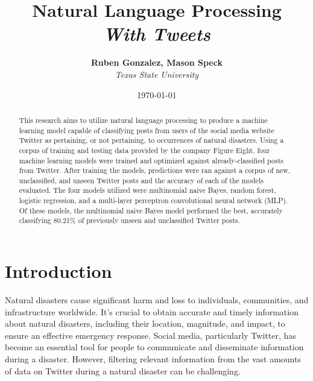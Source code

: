 \documentclass[11pt]{diazessay} %
\title{\textbf{Natural Language Processing} \\ {\Large\itshape With Tweets}} %
\author{\textbf{Ruben Gonzalez, Mason Speck} \\ \textit{Texas State University}} %
\date{\today} %
\begin{document}
\maketitle %



\begin{abstract}
This research aims to utilize natural language processing to produce a machine learning model capable of classifying posts from users of the social media website Twitter as pertaining, or not pertaining, to occurrences of natural disasters. Using a corpus of training and testing data provided by the company Figure Eight, four machine learning models were trained and optimized against already-classified posts from Twitter. After training the models, predictions were ran against a corpus of new, unclassified, and unseen Twitter posts and the accuracy of each of the models evaluated. The four models utilized were multinomial naive Bayes, random forest, logistic regression, and a multi-layer perceptron convolutional neural network (MLP). Of these models, the multinomial naive Bayes model performed the best, accurately classifying 80.21\% of previously unseen and unclassified Twitter posts.
\end{abstract}

\vspace{30pt} %


\section*{Introduction}

Natural disasters cause significant harm and loss to individuals, communities, and infrastructure worldwide. It's crucial to obtain accurate and timely information about natural disasters, including their location, magnitude, and impact, to ensure an effective emergency response. Social media, particularly Twitter, has become an essential tool for people to communicate and disseminate information during a disaster. However, filtering relevant information from the vast amounts of data on Twitter during a natural disaster can be challenging.
\end{document}
